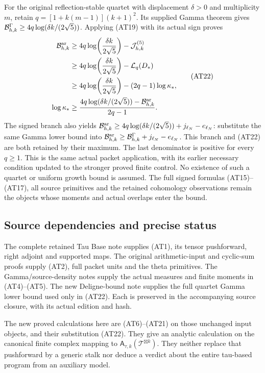 For the original reflection-stable quartet with displacement
$\delta>0$ and multiplicity $m$, retain
$q=[1+k(m-1)](k+1)^2$. Its supplied Gamma theorem gives
$\mathcal B^\Gamma_{h,k}\ge4q\log(\delta k/(2\sqrt5))$.
Applying (AT19) with its actual sign proves
\[
 \begin{aligned}
 \mathcal B^{\mathrm{ar}}_{h,k}
 &\ge4q\log\!\left(\frac{\delta k}{2\sqrt5}\right)
                     -\mathcal J_{h,k}^{(5)}\\
 &\ge4q\log\!\left(\frac{\delta k}{2\sqrt5}\right)
                     -\mathcal L_q(D_*)\\
 &\ge4q\log\!\left(\frac{\delta k}{2\sqrt5}\right)
                     -(2q-1)\log\kappa_*,\\
 \log\kappa_*&\ge
  \frac{4q\log(\delta k/(2\sqrt5))-\mathcal B^{\mathrm{ar}}_{h,k}}{2q-1}.
 \end{aligned}
 \tag{AT22}
\]
The signed branch also yields
$\mathcal B^{\mathrm{ar}}_{h,k}\ge
4q\log(\delta k/(2\sqrt5))+j_{\ell_N}-e_{\ell_N}$:
substitute the same Gamma lower bound into
$\mathcal B^{\mathrm{ar}}_{h,k}\ge\mathcal B^\Gamma_{h,k}
+j_{\ell_N}-e_{\ell_N}$. This branch and (AT22) are both
retained by their maximum.
The last denominator is positive for every $q\ge1$. This is the
same actual packet application, with its earlier necessary
condition updated to the stronger proved finite control.
No existence of such a quartet or uniform growth bound is assumed.
The full signed formulas (AT15)--(AT17), all source primitives and
the retained cohomology observations remain the objects whose
moments and actual overlaps enter the bound.

\subsection{Source dependencies and precise status}

The complete retained Tau Base note supplies (AT1), its tensor
pushforward, right adjoint and supported maps. The original
arithmetic-input and cyclic-sum proofs supply (AT2), full packet
units and the theta primitives. The Gamma/source-density notes
supply the actual measures and finite moments in (AT4)--(AT5).
The new Deligne-bound note supplies the full quartet Gamma
lower bound used only in (AT22). Each is preserved in the
accompanying source closure, with its actual edition and hash.

The new proved calculations here are (AT6)--(AT21) on those
unchanged input objects, and their substitution (AT22). They
give an analytic calculation on the canonical finite complex
mapping to $\mathsf A_{\tau,k}(\mathcal T^{\boxtimes k})$.
They neither replace that pushforward by a generic stalk nor
deduce a verdict about the entire tau-based program from an
auxiliary model.

\endgroup
